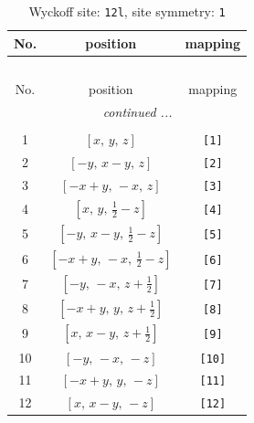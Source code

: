 \documentclass[fleqn,8pt]{jsarticle}
\begin{document}
\begin{longtable}{ccc}
\caption{Wyckoff site: {\tt 12l}, site symmetry: {\tt 1}}
 \\
 \hline \hline
No. & position & mapping \\ \hline \endfirsthead

\multicolumn{2}{l}{\tablename\ \thetable{}} \\
 \hline \hline
No. & position & mapping \\ \hline \endhead

 \hline \hline
\multicolumn{2}{r}{\footnotesize\it continued ...} \\ \endfoot

 \hline \hline
\multicolumn{2}{r}{} \\ \endlastfoot

1 & $\left[ x,\, y,\, z \right]$ & {\tt [1]} \\ \hline
2 & $\left[ - y,\, x - y,\, z \right]$ & {\tt [2]} \\ \hline
3 & $\left[ - x + y,\, - x,\, z \right]$ & {\tt [3]} \\ \hline
4 & $\left[ x,\, y,\, \frac{1}{2} - z \right]$ & {\tt [4]} \\ \hline
5 & $\left[ - y,\, x - y,\, \frac{1}{2} - z \right]$ & {\tt [5]} \\ \hline
6 & $\left[ - x + y,\, - x,\, \frac{1}{2} - z \right]$ & {\tt [6]} \\ \hline
7 & $\left[ - y,\, - x,\, z + \frac{1}{2} \right]$ & {\tt [7]} \\ \hline
8 & $\left[ - x + y,\, y,\, z + \frac{1}{2} \right]$ & {\tt [8]} \\ \hline
9 & $\left[ x,\, x - y,\, z + \frac{1}{2} \right]$ & {\tt [9]} \\ \hline
10 & $\left[ - y,\, - x,\, - z \right]$ & {\tt [10]} \\ \hline
11 & $\left[ - x + y,\, y,\, - z \right]$ & {\tt [11]} \\ \hline
12 & $\left[ x,\, x - y,\, - z \right]$ & {\tt [12]} \\
\end{longtable}
\end{document}
